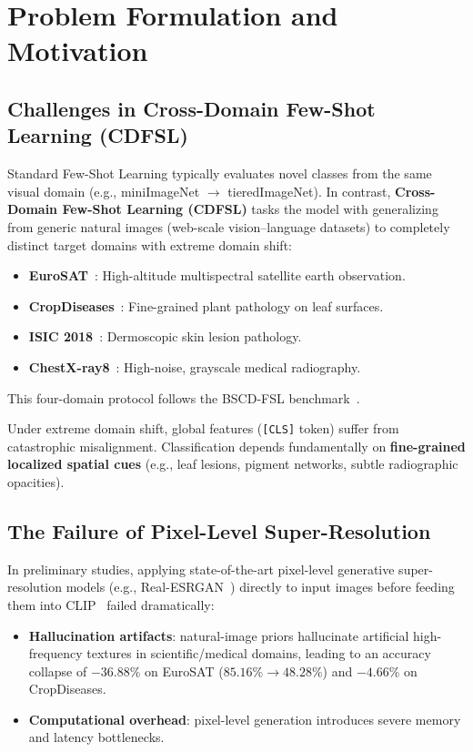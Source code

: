 \documentclass[conference]{IEEEtran}
\begin{document}
\section{Problem Formulation and Motivation}

\subsection{Challenges in Cross-Domain Few-Shot Learning (CDFSL)}
Standard Few-Shot Learning typically evaluates novel classes from the same visual domain (e.g., miniImageNet $\rightarrow$ tieredImageNet). In contrast, \textbf{Cross-Domain Few-Shot Learning (CDFSL)} tasks the model with generalizing from generic natural images (web-scale vision--language datasets) to completely distinct target domains with extreme domain shift:

\begin{itemize}
\item \textbf{EuroSAT}~\cite{helber2019eurosat}: High-altitude multispectral satellite earth observation.
\item \textbf{CropDiseases}~\cite{mohanty2016plantdisease}: Fine-grained plant pathology on leaf surfaces.
\item \textbf{ISIC 2018}~\cite{codella2019isic}: Dermoscopic skin lesion pathology.
\item \textbf{ChestX-ray8}~\cite{wang2017chestxray8}: High-noise, grayscale medical radiography.
\end{itemize}

This four-domain protocol follows the BSCD-FSL benchmark~\cite{guo2020bscdfsl}.

Under extreme domain shift, global features (\texttt{[CLS]} token) suffer from catastrophic misalignment. Classification depends fundamentally on \textbf{fine-grained localized spatial cues} (e.g., leaf lesions, pigment networks, subtle radiographic opacities).

\subsection{The Failure of Pixel-Level Super-Resolution}
In preliminary studies, applying state-of-the-art pixel-level generative super-resolution models (e.g., Real-ESRGAN~\cite{wang2021realesrgan}) directly to input images before feeding them into CLIP~\cite{radford2021clip} failed dramatically:
\begin{itemize}
\item \textbf{Hallucination artifacts}: natural-image priors hallucinate artificial high-frequency textures in scientific/medical domains, leading to an accuracy collapse of $-36.88\%$ on EuroSAT ($85.16\% \rightarrow 48.28\%$) and $-4.66\%$ on CropDiseases.
\item \textbf{Computational overhead}: pixel-level generation introduces severe memory and latency bottlenecks.
\end{itemize}
\end{document}
